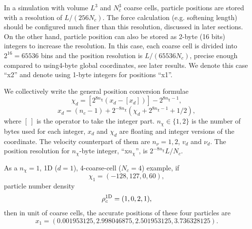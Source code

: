 \documentclass[10pt,twocolumn,preprint]{emulateapj}
\begin{document}
In a simulation with volume $L^3$ and $N_c^3$ coarse cells, particle positions are stored with a resolution of $L/(256N_c)$. The force calculation (e.g. softening length) should be configured much finer than this resolution, discussed in later sections. On the other hand, particle position can also be stored as 2-byte (16 bits) integers to increase the resolution. In this case, each coarse cell is divided into $2^{16}=65536$ bins and the position resolution is $L/(65536N_c)$, precise enough compared to using4-byte global coordinates, see later results. We denote this case ``x2'' and denote using 1-byte integers for positions ``x1''.

We collectively write the general position conversion formulae
\begin{equation}\label{eq.chi}
	\chi_d=\left[2^{8n_\chi}(x_d-\left[x_d\right])\right]-2^{8n_\chi-1},
\end{equation}
\begin{equation}\label{eq.x}
	x_d=(n_c-1)+2^{-8n_\chi}\left(\chi_d+2^{8n_\chi-1}+1/2\right),
\end{equation}
where $[\ ]$ is the operator to take the integer part. $n_\chi\in\{1,2\}$ is the number of bytes used for each integer, $x_d$ and $\chi_d$ are floating and integer versions of the coordinate. The velocity counterpart of them are $n_\nu=1,2$, $v_d$ and $\nu_d$. 
The position resolution for $n_\chi$-byte integer, ``x$n_\chi$'', is $2^{-8n_\chi}L/N_c$.

As a $n_\chi=1$, 1D ($d=1$), 4-coarse-cell ($N_c=4$) example, if $$\chi_1=(-128,127,0,60),$$ particle number density $${\rho_c^{\rm 1D}}=(1,0,2,1),$$ then in unit of coarse cells, the accurate positions of these four particles are $$x_1=(0.001953125, 2.998046875, 2.501953125, 3.736328125).$$
\end{document}
